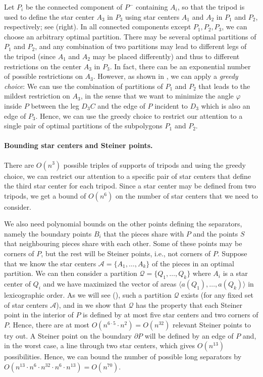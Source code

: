 \documentclass[10pt,a4paper]{article}
\begin{document}
Let $P_i$ be the connected component of $P^{-}$ containing $A_i$, so that the tripod is used to define the star center $A_3$ in $P_3$ using star centers $A_1$ and $A_2$ in $P_1$ and $P_2$, respectively; see  (right).
In all connected components except $P_1,P_2,P_3$, we can choose an arbitrary optimal partition.
There may be several optimal partitions of $P_1$ and $P_2$, and any combination of two partitions may lead to different legs of the tripod (since $A_1$ and $A_2$ may be placed differently) and thus to different restrictions on the center $A_3$ in $P_3$.
In fact, there can be an exponential number of possible restrictions on $A_3$.
However, as shown in , we can apply a \emph{greedy choice}:
We can use the combination of partitions of $P_1$ and $P_2$ that leads to the mildest restriction on $A_3$, in the sense that we want to minimize the angle $\varphi$ inside $P$ between the leg $D_3C$ and the edge of $P$ incident to $D_3$ which is also an edge of $P_3$.
Hence, we can use the greedy choice to restrict our attention to a single pair of optimal partitions of the subpolygons $P_1$ and $P_2$.

\paragraph{Bounding star centers and Steiner points.}
There are $O(n^3)$ possible triples of supports of tripods and using the greedy choice, we can restrict our attention to a specific pair of star centers that define the third star center for each tripod.
Since a star center may be defined from two tripods, we get a bound of $O(n^6)$ on the number of star centers that we need to consider.

We also need polynomial bounds on the other points defining the separators, namely the boundary points $B_i$ that the pieces share with $P$ and the points $S$ that neighbouring pieces share with each other.
Some of these points may be corners of $P$, but the rest will be Steiner points, i.e., not corners of $P$.
Suppose that we know the star centers $\mathcal A=\{A_1,\ldots,A_k\}$ of the pieces in an optimal partition.
We can then consider a partition $\mathcal Q = \{Q_1,\ldots,Q_k\}$ where $A_i$ is a star center of $Q_i$ and we have maximized the vector of areas $\langle a(Q_1),\ldots,a(Q_k)\rangle$ in lexicographic order.
As we will see (), such a partition $\mathcal Q$ exists (for any fixed set of star centers $\mathcal A$), and in  we show that $\mathcal Q$ has the property that each Steiner point in the interior of $P$ is defined by at most five star centers and two corners of $P$.
Hence, there are at most $O(n^{6\cdot 5}\cdot n^2)=O(n^{32})$ relevant Steiner points to try out.
A Steiner point on the boundary $\partial P$ will be defined by an edge of $P$ and, in the worst case, a line through two star centers, which gives $O(n^{13})$ possibilities.
Hence, we can bound the number of possible long separators by $O(n^{13}\cdot n^6\cdot n^{32}\cdot n^6\cdot n^{13})=O(n^{70})$.
\end{document}
